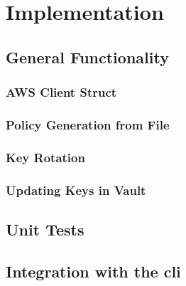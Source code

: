 \chapter{Implementation}
\section{General Functionality}
\subsection{AWS Client Struct}
\subsection{Policy Generation from File}
\subsection{Key Rotation}
\subsection{Updating Keys in Vault}

\section{Unit Tests}

\section{Integration with the \ac{cli}}